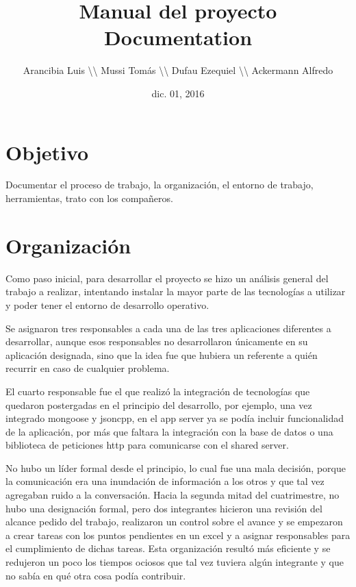 \documentclass[letterpaper,10pt,spanish]{sphinxmanual}
\title{Manual del proyecto Documentation}
\date{dic. 01, 2016}
\author{Arancibia Luis \textbackslash{}\textbackslash{} Mussi Tomás \textbackslash{}\textbackslash{} Dufau Ezequiel \textbackslash{}\textbackslash{} Ackermann Alfredo}
\begin{document}
\maketitle
\tableofcontents
{}\label{index::doc}



\chapter{Objetivo}
\label{manual:objetivo}\label{manual::doc}\label{manual:manual-del-proyecto}
Documentar el proceso de trabajo, la organización, el entorno de trabajo, herramientas, trato con los compañeros.


\chapter{Organización}
\label{manual:organizacion}
Como paso inicial, para desarrollar el proyecto se hizo un análisis general del trabajo a realizar, intentando instalar la mayor parte de las tecnologías a utilizar y poder tener el entorno de desarrollo operativo.

Se asignaron tres responsables a cada una de las tres aplicaciones diferentes a desarrollar, aunque esos responsables no desarrollaron únicamente en su aplicación designada, sino que la idea fue que hubiera un referente a quién recurrir en caso de cualquier problema.

El cuarto responsable fue el que realizó la integración de tecnologías que quedaron postergadas en el principio del desarrollo, por ejemplo, una vez integrado mongoose y jsoncpp, en el app server ya se podía incluir funcionalidad de la aplicación, por más que faltara la integración con la base de datos o una biblioteca de peticiones http para comunicarse con el shared server.

No hubo un líder formal desde el principio, lo cual fue una mala decisión, porque la comunicación era una inundación de información a los otros y que tal vez agregaban ruido a la conversación. Hacia la segunda mitad del cuatrimestre, no hubo una designación formal, pero dos integrantes hicieron una revisión del alcance pedido del trabajo, realizaron un control sobre el avance y se empezaron a crear tareas con los puntos pendientes en un excel y a asignar responsables para el cumplimiento de dichas tareas. Esta organización resultó más eficiente y se redujeron un poco los tiempos ociosos que tal vez tuviera algún integrante y que no sabía en qué otra cosa podía contribuir.
\end{document}

